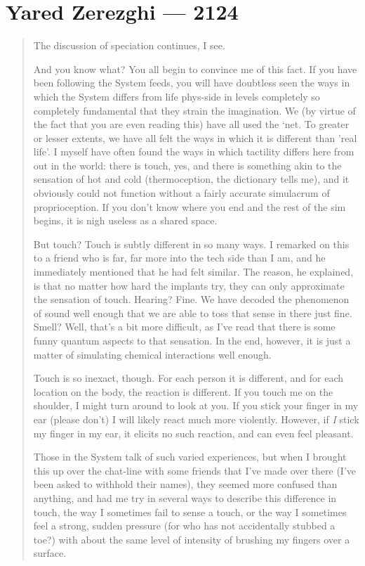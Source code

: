 \hypertarget{yared-zerezghi-2124}{%
\chapter{Yared Zerezghi — 2124}\label{yared-zerezghi-2124}}

\begin{quote}
The discussion of speciation continues, I see.

And you know what? You all begin to convince me of this fact. If you have been following the System feeds, you will have doubtless seen the ways in which the System differs from life phys-side in levels completely so completely fundamental that they strain the imagination. We (by virtue of the fact that you are even reading this) have all used the `net. To greater or lesser extents, we have all felt the ways in which it is different than 'real life'. I myself have often found the ways in which tactility differs here from out in the world: there is touch, yes, and there is something akin to the sensation of hot and cold (thermoception, the dictionary tells me), and it obviously could not function without a fairly accurate simulacrum of proprioception. If you don't know where you end and the rest of the sim begins, it is nigh useless as a shared space.

But touch? Touch is subtly different in so many ways. I remarked on this to a friend who is far, far more into the tech side than I am, and he immediately mentioned that he had felt similar. The reason, he explained, is that no matter how hard the implants try, they can only approximate the sensation of touch. Hearing? Fine. We have decoded the phenomenon of sound well enough that we are able to toss that sense in there just fine. Smell? Well, that's a bit more difficult, as I've read that there is some funny quantum aspects to that sensation. In the end, however, it is just a matter of simulating chemical interactions well enough.

Touch is so inexact, though. For each person it is different, and for each location on the body, the reaction is different. If you touch me on the shoulder, I might turn around to look at you. If you stick your finger in my ear (please don't) I will likely react much more violently. However, if \emph{I} stick my finger in my ear, it elicits no such reaction, and can even feel pleasant.

Those in the System talk of such varied experiences, but when I brought this up over the chat-line with some friends that I've made over there (I've been asked to withhold their names), they seemed more confused than anything, and had me try in several ways to describe this difference in touch, the way I sometimes fail to sense a touch, or the way I sometimes feel a strong, sudden pressure (for who has not accidentally stubbed a toe?) with about the same level of intensity of brushing my fingers over a surface.


\end{quote}

